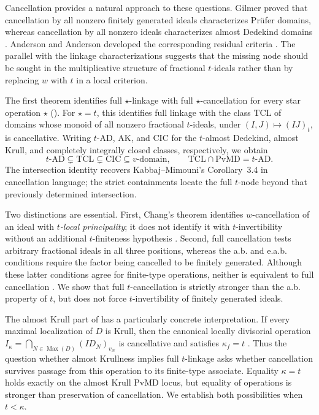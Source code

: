 \documentclass[11pt]{amsart}
\theoremstyle{definition}
\theoremstyle{remark}
\newcommand{\PvMD}{\mathrm{PvMD}}
\newcommand{\TCL}{\mathrm{TCL}}
\newcommand{\CIC}{\mathrm{CIC}}
\newcommand{\AK}{\mathrm{AK}}
\newcommand{\tAD}{t\text{-}\mathrm{AD}}
\newcommand{\Max}{\operatorname{Max}}
\begin{document}
Cancellation provides a natural approach to these questions.  Gilmer
proved that cancellation by all nonzero finitely generated ideals
characterizes Pr\"ufer domains, whereas cancellation by all nonzero ideals
characterizes almost Dedekind domains
\cite[Corollary~1 and Theorem~3]{GilmerCancellation}.  Anderson and Anderson
developed the corresponding residual criteria \cite{AndersonAnderson}.
The parallel with the linkage characterizations suggests that the missing
node should be sought in the multiplicative structure of fractional
$t$-ideals rather than by replacing $w$ with $t$ in a local criterion.

The first theorem identifies full $\star$-linkage with full
$\star$-cancellation for every star operation $\star$
().  For $\star=t$, this identifies full
linkage with the class $\TCL$ of domains whose monoid of all nonzero
fractional $t$-ideals, under $(I,J)\mapsto(IJ)_t$, is cancellative.
Writing $\tAD$, $\AK$, and $\CIC$ for the $t$-almost Dedekind, almost
Krull, and completely integrally closed classes, respectively, we obtain
\begin{equation}\label{eq:intro-chain}
 \tAD\subsetneq\TCL\subsetneq\CIC\subseteq v\text{-domain},
 \qquad \TCL\cap\PvMD=\tAD.
\end{equation}
The intersection identity recovers Kabbaj--Mimouni's
Corollary~3.4 in cancellation language; the strict containments locate the
full $t$-node beyond that previously determined intersection.

Two distinctions are essential.  First, Chang's theorem identifies
$w$-cancellation of an ideal with \emph{$t$-local principality}; it does
not identify it with $t$-invertibility without an additional
$t$-finiteness hypothesis \cite{ChangCancellation}.  Second, full
cancellation tests arbitrary fractional ideals in all three positions,
whereas the a.b. and e.a.b. conditions require the factor being cancelled
to be finitely generated.  Although these latter conditions agree for
finite-type operations, neither is equivalent to full cancellation
\cite{FontanaLoper,MatsudaNote}.  We show that full $t$-cancellation is
strictly stronger than the a.b. property of $t$, but does not force
$t$-invertibility of finitely generated ideals.

The almost Krull part of  has a particularly concrete
interpretation.  If every maximal localization of $D$ is Krull, then the
canonical locally divisorial operation
$I_\kappa=\bigcap_{N\in\Max(D)}(ID_N)_{v_N}$ is cancellative and
satisfies $\kappa_f=t$ \cite{ElBaghdadiIzelgueTamoussit}.  Thus the
question whether almost Krullness implies full $t$-linkage asks whether
cancellation survives passage from this operation to its finite-type
associate.  Equality $\kappa=t$ holds exactly on the almost Krull
$\PvMD$ locus, but equality of operations is stronger than preservation
of cancellation.  We establish both possibilities when $t<\kappa$.
\end{document}
